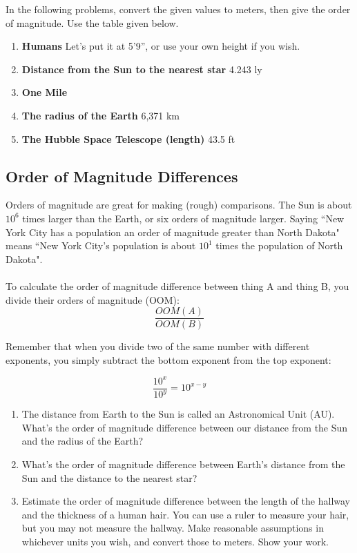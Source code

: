 \documentclass[12pt]{article}
\begin{document}
\begin{flushleft}
In the following problems, convert the given values to meters, then give the order of magnitude.  Use the table given below.  
\begin{enumerate}
\item \textbf{Humans} Let's put it at 5'9'', or use your own height if you wish. %
\item \textbf{Distance from the Sun to the nearest star} 4.243 ly %
\item \textbf{One Mile}
\item \textbf{The radius of the Earth} 6,371 km %
\item \textbf{The Hubble Space Telescope (length)} 43.5 ft
\end{enumerate}


\subsection{Order of Magnitude Differences}
Orders of magnitude are great for making (rough) comparisons. The Sun is about $10^6$ times larger than the Earth, or six orders of magnitude larger.  Saying ``New York City has a population an order of magnitude greater than North Dakota" means ``New York City's population is about $10^1$ times the population of North Dakota". 
\paragraph{}
To calculate the order of magnitude difference between thing A and thing B, you divide their orders of magnitude (OOM):
\begin{equation}
\frac{OOM(A)}{OOM(B)}
\end{equation}

Remember that when you divide two of the same number with different exponents, you simply subtract the bottom exponent from the top exponent:

\begin{equation}
\frac{10^x}{10^y} = 10^{x-y}
\end{equation}

\begin{enumerate}
\item The distance from Earth to the Sun is called an Astronomical Unit (AU).  What's the order of magnitude difference between our distance from the Sun and the radius of the Earth?
\item What's the order of magnitude difference between Earth's distance from the Sun and the distance to the nearest star?
\item Estimate the order of magnitude difference between the length of the hallway and the thickness of a human hair. You can use a ruler to measure your hair, but you may not measure the hallway. Make reasonable assumptions in whichever units you wish, and convert those to meters.  Show your work. %
\end{enumerate}


\end{flushleft}
\end{document}
